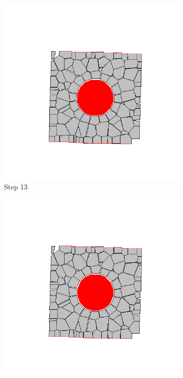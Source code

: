 \begin{figure}[ht!]
      \begin{subfigure}{.25\textwidth}
        \centering
        \includegraphics[width=1.0\linewidth]{Files/Small_ASR/CR/DEP5-STEP(013).png}
      \caption{Step 13}
      \end{subfigure}%
      \begin{subfigure}{.25\textwidth}
        \centering
        \includegraphics[width=1.0\linewidth]{Files/Small_ASR/CR/DEP5-STEP(014).png}

\end{subfigure}
\end{figure}
